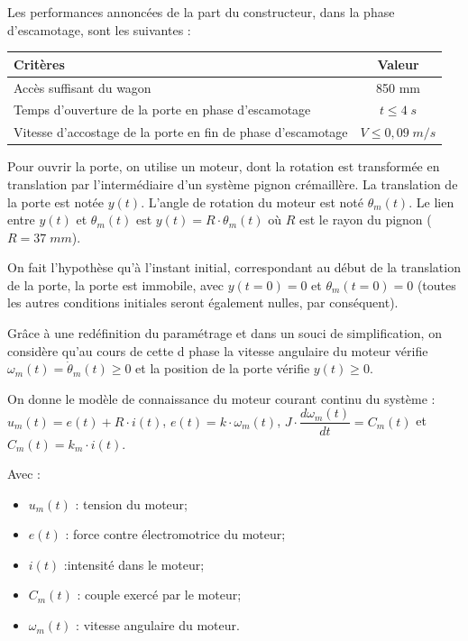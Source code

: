 \documentclass[10pt,fleqn]{article} %
\begin{document}
\begin{multicols}{2}
Les performances annoncées de la part du constructeur, dans la phase d'escamotage, sont les suivantes :
\begin{center}
\begin{tabular}{|p{.6\linewidth}|c|}
\hline
Critères & Valeur \\
\hline
\hline
Accès suffisant du wagon & 850 mm \\
\hline
Temps d'ouverture de la porte en phase d'escamotage & $t\leq 4\; s$ \\
\hline
Vitesse d’accostage de la porte en fin de phase d’escamotage & $V\leq 0,09 \; m/s$ \\
\hline
\end{tabular}
\end{center}


Pour ouvrir la porte, on utilise un moteur, dont la rotation est transformée en translation par l'intermédiaire d'un système pignon crémaillère. La translation de la porte est notée $y(t)$. L'angle de rotation du moteur est noté $\theta_m(t)$. Le lien entre $y(t)$ et $\theta_m (t)$ est $y(t) = R\cdot\theta_m (t)$ où $R$ est le rayon du pignon ($R=37\; mm$).

On fait l'hypothèse qu'à l'instant initial, correspondant au début de la translation de la porte, la porte est immobile, avec $y(t=0)=0$ et $\theta_m (t=0)=0$ (toutes les autres conditions initiales seront également nulles, par conséquent).

Grâce à une redéfinition du paramétrage et dans un souci de simplification, on considère qu'au cours de cette d phase la vitesse angulaire du moteur vérifie $\omega_m (t) = \dot{\theta}_m (t) \geq 0$ et la position de la porte vérifie $y(t) \geq 0$.  


On donne le modèle de connaissance du moteur courant continu du système :
$u_m(t) = e(t) + R\cdot i(t)$, $e(t) = k\cdot \omega_m(t)$, $J\cdot \dfrac{d\omega_m(t)}{dt} = C_m (t)$ et $C_m (t) = k_m \cdot i(t)$.

Avec : 
\begin{itemize}
\item $u_m (t)$ : tension du moteur; 
\item $e(t)$ : force contre électromotrice du moteur; 
\item $i(t)$ :intensité dans le moteur;
\item $C_m (t)$ : couple exercé par le moteur;
\item $\omega_m(t)$ : vitesse angulaire du moteur.
\end{itemize}



\end{multicols}
\end{document}
